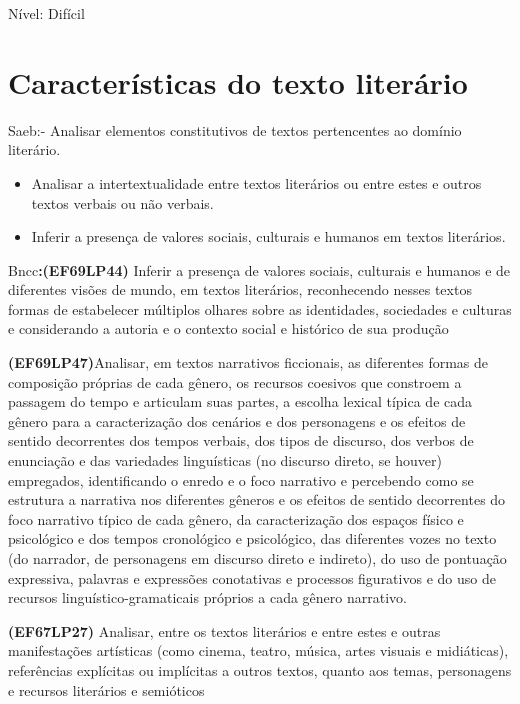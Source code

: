 {Nível: Difícil

\pagestyle{port}
\chapter{Características do texto literário}

Saeb:- Analisar elementos constitutivos de textos pertencentes ao
domínio literário.

\begin{itemize}
\item
  Analisar a intertextualidade entre textos literários ou entre estes e
  outros textos verbais ou não verbais.
\item
  Inferir a presença de valores sociais, culturais e humanos em textos
  literários.
\end{itemize}

Bncc\textbf{:(EF69LP44)} Inferir a presença de valores sociais,
culturais e humanos e de diferentes visões de mundo, em textos
literários, reconhecendo nesses textos formas de estabelecer múltiplos
olhares sobre as identidades, sociedades e culturas e considerando a
autoria e o contexto social e histórico de sua produção

\textbf{(EF69LP47)}Analisar, em textos narrativos ficcionais, as
diferentes formas de composição próprias de cada gênero, os recursos
coesivos que constroem a passagem do tempo e articulam suas partes, a
escolha lexical típica de cada gênero para a caracterização dos cenários
e dos personagens e os efeitos de sentido decorrentes dos tempos
verbais, dos tipos de discurso, dos verbos de enunciação e das
variedades linguísticas (no discurso direto, se houver) empregados,
identificando o enredo e o foco narrativo e percebendo como se estrutura
a narrativa nos diferentes gêneros e os efeitos de sentido decorrentes
do foco narrativo típico de cada gênero, da caracterização dos espaços
físico e psicológico e dos tempos cronológico e psicológico, das
diferentes vozes no texto (do narrador, de personagens em discurso
direto e indireto), do uso de pontuação expressiva, palavras e
expressões conotativas e processos figurativos e do uso de recursos
linguístico-gramaticais próprios a cada gênero narrativo.

\textbf{(EF67LP27)} Analisar, entre os textos literários e entre estes e
outras manifestações artísticas (como cinema, teatro, música, artes
visuais e midiáticas), referências explícitas ou implícitas a outros
textos, quanto aos temas, personagens e recursos literários e semióticos

}
